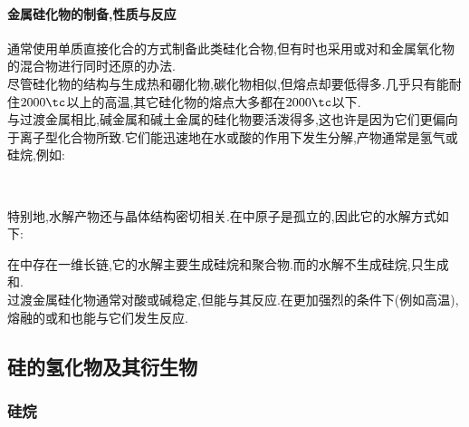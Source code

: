 \documentclass{ctexart}
\begin{document}
\paragraph{金属硅化物的制备,性质与反应}
通常使用单质直接化合的方式制备此类硅化合物,但有时也采用或对和金属氧化物的混合物进行同时还原的办法.\\
\indent 尽管硅化物的结构与生成热和硼化物,碳化物相似,但熔点却要低得多.几乎只有能耐住$2000\tc$以上的高温,其它硅化物的熔点大多都在$2000\tc$以下.\\
\indent 与过渡金属相比,碱金属和碱土金属的硅化物要活泼得多,这也许是因为它们更偏向于离子型化合物所致.它们能迅速地在水或酸的作用下发生分解,产物通常是氢气或硅烷,例如:
\begin{center}
    \\
\end{center}
特别地,水解产物还与晶体结构密切相关.在中原子是孤立的,因此它的水解方式如下:
\begin{center}
\end{center}
在中存在一维长链,它的水解主要生成硅烷和聚合物.而的水解不生成硅烷,只生成和.\\
\indent 过渡金属硅化物通常对酸或碱稳定,但能与其反应.在更加强烈的条件下(例如高温),熔融的或和也能与它们发生反应.
\subsection{硅的氢化物及其衍生物}
\subsubsection{硅烷}
\end{document}
